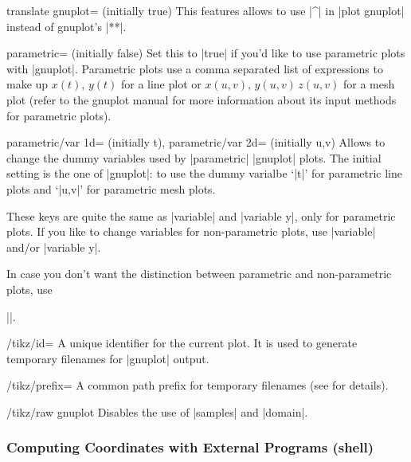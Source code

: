 {\begin{pgfplotskey}{translate gnuplot= (initially true)}
	This features allows to use |^| in |plot gnuplot| instead of gnuplot's |**|.
\end{pgfplotskey}

\begin{pgfplotskey}{parametric= (initially false)}
	Set this to |true| if you'd like to use parametric plots with |gnuplot|. Parametric plots use a comma separated list of expressions to make up $x(t),\, y(t)$ for a line plot or $x(u,v), \, y(u,v)\, z(u,v)$ for a mesh plot (refer to the gnuplot manual for more information about its input methods for parametric plots).
\end{pgfplotskey}

\begin{pgfplotskeylist}{%
	parametric/var 1d= (initially t),%
	parametric/var 2d= (initially {u,v})%
	}
	Allows to change the dummy variables used by |parametric| |gnuplot| plots. The initial setting is the one of |gnuplot|: to use the dummy varialbe `|t|' for parametric line plots and `|u,v|' for parametric mesh plots. 

	These keys are quite the same as |variable| and |variable y|, only for parametric plots. If you like to change variables for non-parametric plots, use |variable| and/or |variable y|.

	In case you don't want the distinction between parametric and non-parametric plots, use 
	
	|\pgfplotsset{parametric/var 1d=,parametric/var 2d=}|.

\end{pgfplotskeylist}

\begin{key}{/tikz/id=}
	 A unique identifier for the current plot. It is used to generate temporary filenames for |gnuplot| output.
\end{key}

\begin{key}{/tikz/prefix=}
	 A common path prefix for temporary filenames (see \cite[section~18.6]{tikz} for details).
\end{key}

\begin{key}{/tikz/raw gnuplot}
	 Disables the use of |samples| and |domain|.
\end{key}

\subsubsection{Computing Coordinates with External Programs (shell)}

}
